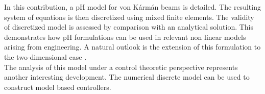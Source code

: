 \documentclass{ifacconf}
\begin{document}
In this contribution, a pH model for von K\'arm\'an beams is detailed. The resulting system of equations is then discretized using mixed finite elements. The validity of discretized model is assessed by comparison with an analytical solution. This demonstrates how pH formulations can be used in relevant non linear models arising from engineering. A natural outlook is the extension of this formulation to the two-dimensional case \cite{brugnoli2021enoc}. \\

The analysis of this model under a control theoretic perspective represents another interesting development. The numerical discrete model can be used to construct model based controllers.


\appendix

      
\end{document}
